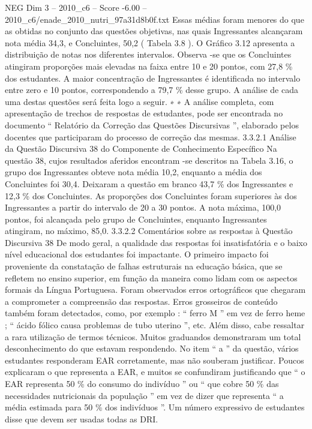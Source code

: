 \begin{textsample}{NEG Dim 3 – 2010\_c6 – Score -6.00 – 2010\_c6/enade\_2010\_nutri\_97a31d8b0f.txt}
Essas médias foram menores do que as obtidas no conjunto das questões objetivas, nas quais Ingressantes alcançaram nota média 34,3, e Concluintes, 50,2 ( Tabela 3.8 ).
O Gráfico 3.12 apresenta a distribuição de notas nos diferentes intervalos.
Observa -se que os Concluintes atingiram proporções mais elevadas na faixa entre 10 e 20 pontos, com 27,8 \% dos estudantes.
A maior concentração de Ingressantes é identificada no intervalo entre zero e 10 pontos, correspondendo a 79,7 \% desse grupo.
A análise de cada uma destas questões será feita logo a seguir. ∗ ∗ A análise completa, com apresentação de trechos de respostas de estudantes, pode ser encontrada no documento “ Relatório da Correção das Questões Discursivas ”, elaborado pelos docentes que participaram do processo de correção das mesmas. 3.3.2.1 Análise da Questão Discursiva 38 do Componente de Conhecimento Específico Na questão 38, cujos resultados aferidos encontram -se descritos na Tabela 3.16, o grupo dos Ingressantes obteve nota média 10,2, enquanto a média dos Concluintes foi 30,4.
Deixaram a questão em branco 43,7 \% dos Ingressantes e 12,3 \% dos Concluintes.
As proporções dos Concluintes foram superiores às dos Ingressantes a partir do intervalo de 20 a 30 pontos.
A nota máxima, 100,0 pontos, foi alcançada pelo grupo de Concluintes, enquanto Ingressantes atingiram, no máximo, 85,0. 3.3.2.2 Comentários sobre as respostas à Questão Discursiva 38 De modo geral, a qualidade das respostas foi insatisfatória e o baixo nível educacional dos estudantes foi impactante.
O primeiro impacto foi proveniente da constatação de falhas estruturais na educação básica, que se refletem no ensino superior, em função da maneira como lidam com os aspectos formais da Língua Portuguesa.
Foram observados erros ortográficos que chegaram a comprometer a compreensão das respostas.
Erros grosseiros de conteúdo também foram detectados, como, por exemplo : “ ferro M ” em vez de ferro heme ; “ ácido fólico causa problemas de tubo uterino ”, etc.
Além disso, cabe ressaltar a rara utilização de termos técnicos.
Muitos graduandos demonstraram um total desconhecimento do que estavam respondendo.
No item “ a ” da questão, vários estudantes responderam EAR corretamente, mas não souberam justificar.
Poucos explicaram o que representa a EAR, e muitos se confundiram justificando que “ o EAR representa 50 \% do consumo do indivíduo ” ou “ que cobre 50 \% das necessidades nutricionais da população ” em vez de dizer que representa “ a média estimada para 50 \% dos indivíduos ”.
Um número expressivo de estudantes disse que devem ser usadas todas as DRI.

\end{textsample}
